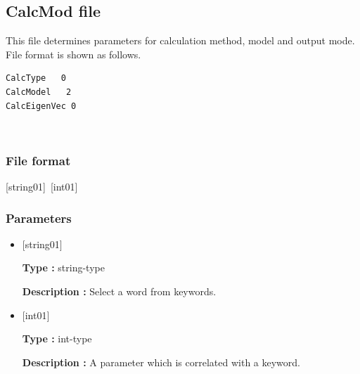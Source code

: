 \subsection{CalcMod file}
\label{Subsec:calcmod}
This file determines parameters for calculation method, model and output mode. File format is shown as follows.\\
\begin{minipage}{10cm}
\begin{screen}
\begin{verbatim}
CalcType   0
CalcModel   2
CalcEigenVec 0
\end{verbatim}
\end{screen}
\end{minipage}
\\
\subsubsection{File format}
[string01]~[int01]
\subsubsection{Parameters}
 \begin{itemize}
   \item  $[$string01$]$
   
   {\bf Type :} string-type
   
   {\bf Description :} Select a word from keywords.
   
   \item  $[$int01$]$
   
    {\bf Type :} int-type 

   {\bf Description :} A parameter which is correlated with a keyword.\\

   
  \end{itemize}

